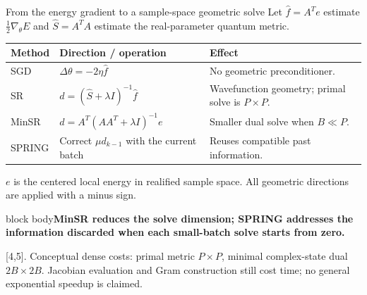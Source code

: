 \documentclass[aspectratio=169,10pt]{beamer}
\newcommand{\src}[1]{\vfill{\fontsize{6.3}{7.5}\selectfont\color{muted}#1\par}}
\newcommand{\take}[1]{\vspace{1mm}\begin{beamercolorbox}[sep=1.6mm,wd=\textwidth]{block body}\small\color{teal}\textbf{#1}\end{beamercolorbox}}
\begin{document}
\begin{frame}{From the energy gradient to a sample-space geometric solve}
\small Let $\widehat f=A^Te$ estimate $\tfrac12\nabla_\theta E$ and $\widehat S=A^TA$ estimate the real-parameter quantum metric.
\vspace{2mm}
\renewcommand{\arraystretch}{1.2}
\begin{tabular}{@{}L{.16\textwidth}L{.43\textwidth}L{.33\textwidth}@{}}
\toprule
Method & Direction / operation & Effect\\\midrule
SGD & $\Delta\theta=-2\eta\widehat f$ & No geometric preconditioner.\\
SR & $d=(\widehat S+\lambda I)^{-1}\widehat f$ & Wavefunction geometry; primal solve is $P\times P$.\\
MinSR & $d=A^T(AA^T+\lambda I)^{-1}e$ & Smaller dual solve when $B\ll P$.\\
SPRING & Correct $\mu d_{k-1}$ with the current batch & Reuses compatible past information.\\\bottomrule
\end{tabular}\par
\vspace{2mm}
\small $e$ is the centered local energy in realified sample space. All geometric directions are applied with a minus sign.
\take{MinSR reduces the solve dimension; SPRING addresses the information discarded when each small-batch solve starts from zero.}
\src{[4,5]. Conceptual dense costs: primal metric $P\times P$, minimal complex-state dual $2B\times2B$. Jacobian evaluation and Gram construction still cost time; no general exponential speedup is claimed.}
\end{frame}
\end{document}
